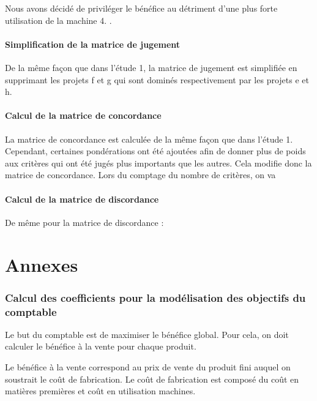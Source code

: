 \documentclass[a4paper,10pt]{article}
\begin{document}
Nous avons décidé de priviléger le bénéfice au détriment d'une plus forte utilisation de la machine 4. .

\subsection{Simplification de la matrice de jugement}

De la même façon que dans l'étude 1, la matrice de jugement est simplifiée en supprimant les projets f et g qui sont dominés respectivement par les projets e et h.

\subsection{Calcul de la matrice de concordance}

La matrice de concordance est calculée de la même façon que dans l'étude 1. Cependant, certaines pondérations ont été ajoutées afin de donner plus de poids aux critères qui ont été jugés plus importants que les autres. Cela modifie donc la matrice de concordance. Lors du comptage du nombre de critères, on va


\subsection{Calcul de la matrice de discordance}

De même pour la matrice de discordance :




\newpage
\part{Annexes}
\appendix

\section{Calcul des coefficients pour la modélisation des objectifs du comptable}
\label{annexe}

Le but du comptable est de maximiser le bénéfice global. Pour cela, on doit
calculer le bénéfice à la vente pour chaque produit.

Le bénéfice à la vente correspond au prix de vente du produit fini auquel
on soustrait le coût de fabrication. Le coût de fabrication est composé du
coût en matières premières et coût en utilisation machines.
\end{document}
